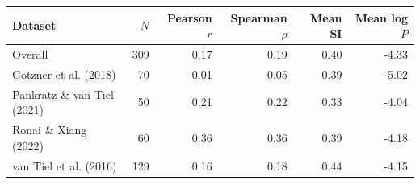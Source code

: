 \begin{tabular}{lrrrrr}
\hline
Dataset & $N$ & Pearson $r$ & Spearman $\rho$ & Mean SI & Mean log $P$ \\
\hline
Overall & 309 & 0.17 & 0.19 & 0.40 & -4.33 \\
Gotzner et al. (2018) & 70 & -0.01 & 0.05 & 0.39 & -5.02 \\
Pankratz \& van Tiel (2021) & 50 & 0.21 & 0.22 & 0.33 & -4.04 \\
Ronai \& Xiang (2022) & 60 & 0.36 & 0.36 & 0.39 & -4.18 \\
van Tiel et al. (2016) & 129 & 0.16 & 0.18 & 0.44 & -4.15 \\
\hline
\end{tabular}